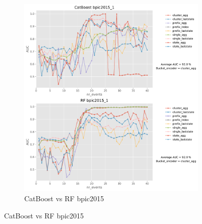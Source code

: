 \documentclass[twoside,11pt]{Latex/Classes/PhDthesisPSnPDF}
\begin{document}
\begin{figure}[t!]
\begin{subfigure}{0.48\textwidth}
		\includegraphics[width=\linewidth]{images/catboost/graphsrf/bpic2015_1_CatBoost_rf.pdf}
		\caption{CatBoost vs RF bpic2015} \label{fig:b151cr}
	\end{subfigure}
	

\end{figure}
\end{document}
